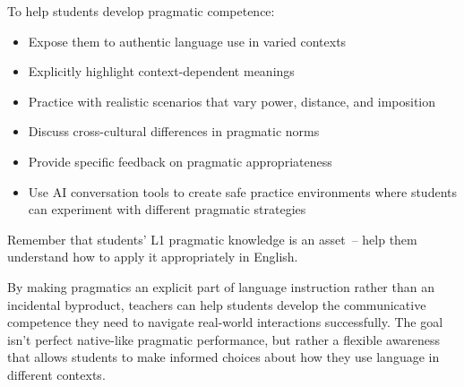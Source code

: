 \begin{tcolorbox}[title=Teaching Pragmatic Competence, colback=white]
To help students develop pragmatic competence:
\begin{itemize}[noitemsep]
    \item Expose them to authentic language use in varied contexts
    \item Explicitly highlight context-dependent meanings
    \item Practice with realistic scenarios that vary power, distance, and imposition
    \item Discuss cross-cultural differences in pragmatic norms
    \item Provide specific feedback on pragmatic appropriateness
    \item Use AI conversation tools to create safe practice environments where students can experiment with different pragmatic strategies
\end{itemize}
Remember that students' L1 pragmatic knowledge is an asset~-- help them understand how to apply it appropriately in English.
\end{tcolorbox}

By making pragmatics an explicit part of language instruction rather than an incidental byproduct, teachers can help students develop the communicative competence they need to navigate real-world interactions successfully. The goal isn't perfect native-like pragmatic performance, but rather a flexible awareness that allows students to make informed choices about how they use language in different contexts.

